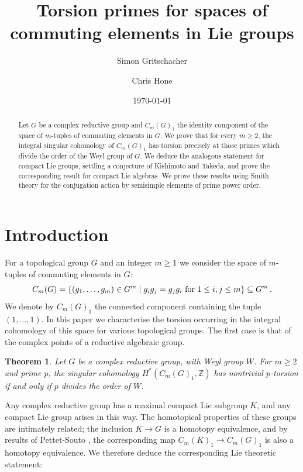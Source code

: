 \documentclass[oneside, 12pt, a4paper]{amsart}
\title[Torsion primes for spaces of commuting elements]{Torsion primes for spaces of commuting elements in Lie groups}
\author{Simon Gritschacher}
\author{Chris Hone}
\date{\today}
\numberwithin{equation}{section}
\newcommand{\Z}{\mathbb{Z}}
\theoremstyle{plain}
\newtheorem{theorem}{Theorem}[section]
\theoremstyle{definition}
\theoremstyle{remark}
\begin{document}
\maketitle

\begin{abstract}
Let $G$ be a complex reductive group and $C_m(G)_1$ the identity component of the space of $m$-tuples of commuting elements in $G$. We prove that for every $m\geq 2$, the integral singular cohomology of $C_m(G)_1$ has torsion precisely at those primes which divide the order of the Weyl group of $G$. We deduce the analogous statement for compact Lie groups, settling a conjecture of Kishimoto and Takeda, and prove the corresponding result for compact Lie algebras. We prove these results using Smith theory for the conjugation action by semisimple elements of prime power order. \end{abstract}



\section{Introduction}
For a topological group $G$ and an integer $m\geq 1$ we consider the space of $m$-tuples of commuting elements in $G$:
\[
C_m(G)=\{(g_1,\dots,g_m)\in G^m\mid g_ig_j=g_jg_i \textnormal{ for } 1\leq i,j\leq m\}\subseteq G^m\, .
\]
We denote by $C_m(G)_1$ the connected component containing the tuple $(1,\dots,1)$. In this paper we characterise the torsion occurring in the integral cohomology of this space for various topological groups. The first case is that of the complex points of a reductive algebraic group. 

\begin{theorem} \label{thm:mainreductive}
Let $G$ be a complex reductive group, with Weyl group $W$. For $m\geq 2$ and prime $p$, the singular cohomology $H^*(C_m(G)_1,\Z)$ has nontrivial $p$-torsion if and only if $p$ divides the order of $W$.
\end{theorem}

Any complex reductive group has a maximal compact Lie subgroup $K$, and any compact Lie group arises in this way. The homotopical properties of these groups are intimately related; the inclusion $K\to G$ is a homotopy equivalence, and by results of Pettet-Souto \cite{PettetSouto}, the corresponding map $C_m(K)_1\to C_m(G)_1$ is also a homotopy equivalence. We therefore deduce the corresponding Lie theoretic statement:
\end{document}
